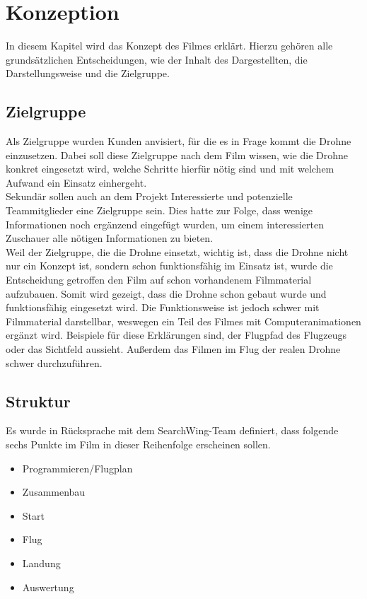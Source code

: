 \chapter{Konzeption}
\label{ch:intro}
In diesem Kapitel wird das Konzept des Filmes erklärt. Hierzu gehören alle grundsätzlichen Entscheidungen, wie der Inhalt des Dargestellten, die Darstellungsweise und die Zielgruppe.

\section{Zielgruppe}
\label{sec:konzept:zielgruppe}


Als Zielgruppe wurden Kunden anvisiert, für die es in Frage kommt die Drohne einzusetzen. Dabei soll diese Zielgruppe nach dem Film wissen, wie die Drohne konkret eingesetzt wird, welche Schritte hierfür nötig sind und mit welchem Aufwand ein Einsatz einhergeht.\\
Sekundär sollen auch an dem Projekt Interessierte und potenzielle Teammitglieder eine Zielgruppe sein. Dies hatte zur Folge, dass wenige Informationen noch ergänzend eingefügt wurden, um einem interessierten Zuschauer alle nötigen Informationen zu bieten.\\
Weil der Zielgruppe, die die Drohne einsetzt, wichtig ist, dass die Drohne nicht nur ein Konzept ist, sondern schon funktionsfähig im Einsatz ist, wurde die Entscheidung getroffen den Film auf schon vorhandenem Filmmaterial aufzubauen. Somit wird gezeigt, dass die Drohne schon gebaut wurde und funktionsfähig eingesetzt wird. Die Funktionsweise ist jedoch schwer mit Filmmaterial darstellbar, weswegen ein Teil des Filmes mit Computeranimationen ergänzt wird. Beispiele für diese Erklärungen sind, der Flugpfad des Flugzeugs oder das Sichtfeld aussieht. Außerdem das Filmen im Flug der realen Drohne schwer durchzuführen.

\section{Struktur} %
\label{sec:konzept:outline}

Es wurde in Rücksprache mit dem SearchWing-Team definiert, dass folgende sechs Punkte im Film in dieser Reihenfolge erscheinen sollen.

\begin{itemize}
\item{Programmieren/Flugplan}
\item{Zusammenbau}
\item{Start}
\item{Flug}
\item{Landung}
\item{Auswertung}
\end{itemize}

